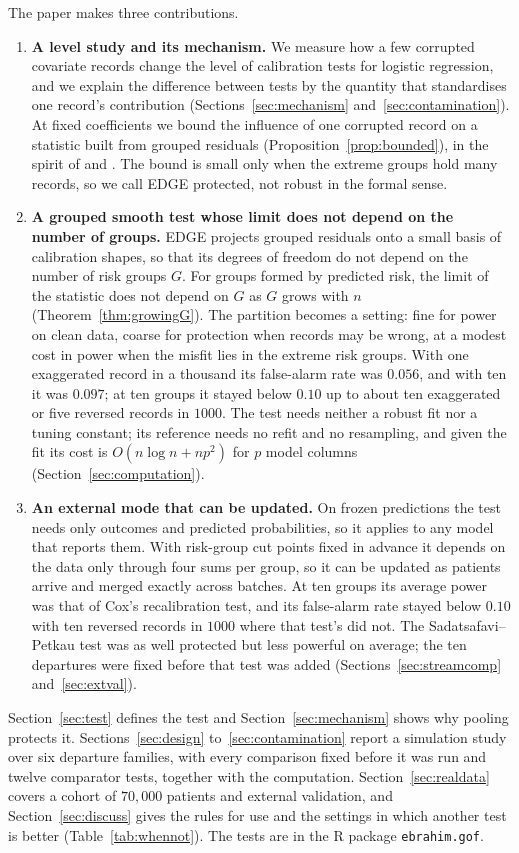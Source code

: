 The paper makes three contributions.

\begin{enumerate}
\item \textbf{A level study and its mechanism.} We measure how a few corrupted covariate records
change the level of calibration tests for logistic regression, and we explain the difference between
tests by the quantity that standardises one record's contribution (Sections~\ref{sec:mechanism}
and~\ref{sec:contamination}). At fixed coefficients we bound the influence of one corrupted record on
a statistic built from grouped residuals (Proposition~\ref{prop:bounded}), in the spirit of
\citet{lambert1981influence} and \citet{he1990breakdown}. The bound is small only when the extreme
groups hold many records, so we call EDGE protected, not robust in the formal sense.
\item \textbf{A grouped smooth test whose limit does not depend on the number of groups.} EDGE
projects grouped residuals onto a small basis of calibration shapes, so that its degrees of freedom do
not depend on the number of risk groups $G$. For groups formed by predicted risk, the limit of the
statistic does not depend on $G$ as $G$ grows with $n$ (Theorem~\ref{thm:growingG}). The partition
becomes a setting: fine for power on clean data, coarse for protection when records may be wrong, at a
modest cost in power when the misfit lies in the extreme risk groups. With one exaggerated record in a
thousand its false-alarm rate was $0.056$, and with ten it was $0.097$; at ten groups it stayed below
$0.10$ up to about ten exaggerated or five reversed records in $1000$. The test needs neither a robust
fit nor a tuning constant; its reference needs no refit and no resampling, and given the fit its cost
is $O(n\log n+np^2)$ for $p$ model columns (Section~\ref{sec:computation}).
\item \textbf{An external mode that can be updated.} On frozen predictions the test needs only
outcomes and predicted probabilities, so it applies to any model that reports them. With risk-group
cut points fixed in advance it depends on the data only through four sums per group, so it can be
updated as patients arrive and merged exactly across batches. At ten groups its average power was
that of Cox's recalibration test, and its false-alarm rate stayed below $0.10$ with ten reversed
records in $1000$ where that test's did not. The Sadatsafavi--Petkau test was as well protected but
less powerful on average; the ten departures were fixed before that test was added
(Sections~\ref{sec:streamcomp} and~\ref{sec:extval}).
\end{enumerate}

Section~\ref{sec:test} defines the test and Section~\ref{sec:mechanism} shows why pooling protects it.
Sections~\ref{sec:design} to~\ref{sec:contamination} report a simulation study over six departure
families, with every comparison fixed before it was run and twelve comparator tests, together with the
computation. Section~\ref{sec:realdata} covers a cohort of $70{,}000$ patients and external validation,
and Section~\ref{sec:discuss} gives the rules for use and the settings in which another test is better
(Table~\ref{tab:whennot}). The tests are in the R package \texttt{ebrahim.gof}.
